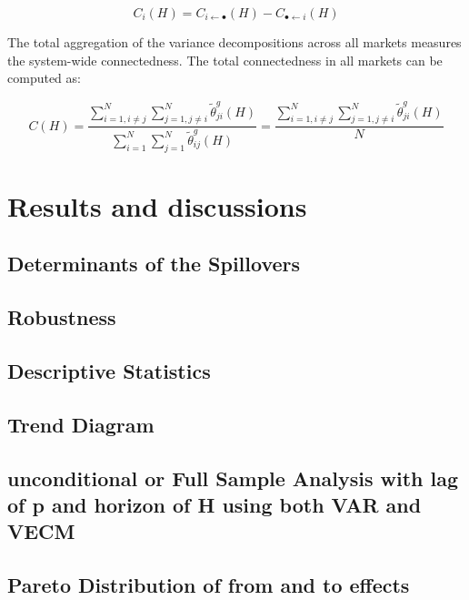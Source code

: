 \documentclass[]{elsarticle} %
\begin{document}
\[{{C}_{i}}\left( H \right)={{C}_{i\leftarrow \bullet }}\left( H \right)-{{C}_{\bullet \leftarrow i}}\left( H \right)\]

The total aggregation of the variance decompositions across all markets
measures the system-wide connectedness. The total connectedness in all
markets can be computed as:

\[C\left( H \right)=\frac{\sum\nolimits_{i=1,i\ne j}^{N}{\sum\nolimits_{j=1,j\ne i}^{N}{\tilde{\theta }_{ji}^{g}\left( H \right)}}}{\sum\nolimits_{i=1}^{N}{\sum\nolimits_{j=1}^{N}{\tilde{\theta }_{ij}^{g}\left( H \right)}}}=\frac{\sum\nolimits_{i=1,i\ne j}^{N}{\sum\nolimits_{j=1,j\ne i}^{N}{\tilde{\theta }_{ji}^{g}\left( H \right)}}}{N}\]

\section{Results and discussions}\label{results-and-discussions}

\subsection{Determinants of the
Spillovers}\label{determinants-of-the-spillovers}

\subsection{Robustness}\label{robustness}

\subsection{Descriptive Statistics}\label{descriptive-statistics}

\subsection{Trend Diagram}\label{trend-diagram}

\subsection{unconditional or Full Sample Analysis with lag of p and
horizon of H using both VAR and
VECM}\label{unconditional-or-full-sample-analysis-with-lag-of-p-and-horizon-of-h-using-both-var-and-vecm}

\subsection{Pareto Distribution of from and to
effects}\label{pareto-distribution-of-from-and-to-effects}
\end{document}

